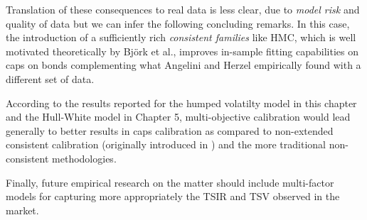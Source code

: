 Translation of these consequences to real data is less clear, due to
{\sl model risk} and quality of data but we can infer the following
concluding remarks. In this case, the introduction of a sufficiently
rich {\sl consistent families} like HMC, which is well motivated
theoretically by Bj\"ork et al., improves in-sample fitting
capabilities on caps on bonds complementing what Angelini and Herzel
\cite{AH:2002,AH:2005} empirically found with a different set of data. 

According to the results reported for the humped volatilty model in
this chapter and the Hull-White model in Chapter 5, multi-objective
calibration would lead generally to better results in caps calibration
as compared to non-extended consistent calibration (originally
introduced in \cite{AH:2002,AH:2005}) and the 
more traditional non-consistent methodologies.

Finally, future empirical research on the matter should include
multi-factor models for capturing more appropriately the TSIR and TSV
observed in the market. %









